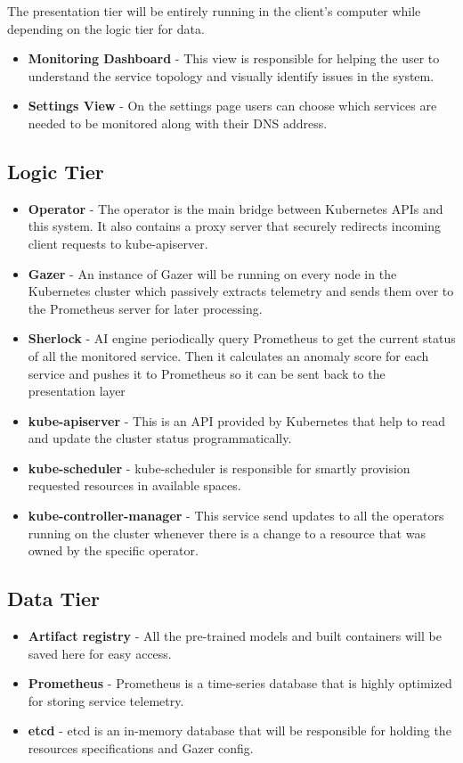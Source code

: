 The presentation tier will be entirely running in the client's computer while depending on the logic tier for data.

\begin{itemize}
    \item \textbf{Monitoring Dashboard} - This view is responsible for helping the user to understand the service topology and visually identify issues in the system.
    \item \textbf{Settings View} - On the settings page users can choose which services are needed to be monitored along with their DNS address.
\end{itemize}

\subsection{Logic Tier}

\begin{itemize}
    \item \textbf{Operator} - The operator is the main bridge between Kubernetes APIs and this system. It also contains a proxy server that securely redirects incoming client requests to kube-apiserver.
    \item \textbf{Gazer} - An instance of Gazer will be running on every node in the Kubernetes cluster which passively extracts telemetry and sends them over to the Prometheus server for later processing.
    \item \textbf{Sherlock} - AI engine periodically query Prometheus to get the current status of all the monitored service. Then it calculates an anomaly score for each service and pushes it to Prometheus so it can be sent back to the presentation layer
    \item \textbf{kube-apiserver} - This is an API provided by Kubernetes that help to read and update the cluster status programmatically.
    \item \textbf{kube-scheduler} - kube-scheduler is responsible for smartly provision requested resources in available spaces.
    \item \textbf{kube-controller-manager} - This service send updates to all the operators running on the cluster whenever there is a change to a resource that was owned by the specific operator.
\end{itemize}

\subsection{Data Tier}

\begin{itemize}
    \item \textbf{Artifact registry} - All the pre-trained models and built containers will be saved here for easy access.
    \item \textbf{Prometheus} - Prometheus is a time-series database that is highly optimized for storing service telemetry.
    \item \textbf{etcd} - etcd is an in-memory database that will be responsible for holding the resources specifications and Gazer config.
\end{itemize}